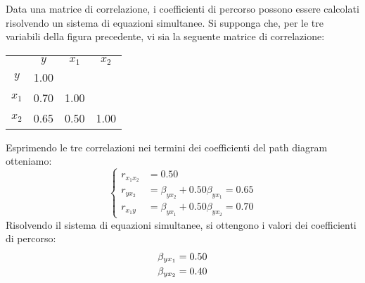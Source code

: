 Data una matrice di correlazione, i coefficienti di percorso possono essere calcolati risolvendo un sistema di equazioni simultanee. 
Si supponga che, per le tre variabili della figura precedente, vi sia la seguente matrice di correlazione:

\begin{center}
    \begin{tabular}{cccc}
          & $y$ & $x_1$ & $x_2$\\
     $y$  & 1.00 &    &   \\
     $x_1$ &  0.70 & 1.00 &    \\
     $x_2$ &  0.65 & 0.50 & 1.00\\
    \end{tabular}
\end{center}
Esprimendo le tre correlazioni nei termini dei coefficienti del path diagram otteniamo:
\[  
\begin{cases} 
r_{x_1x_2} &= 0.50\\ 
r_{yx_2} &= \beta_{yx_2} + 0.50 \beta_{yx_1} = 0.65\\ 
r_{x_1y} &= \beta_{yx_1} +   0.50 \beta_{yx_2} = 0.70
\end{cases} 
\] 
Risolvendo il sistema di equazioni simultanee, si ottengono i
  valori dei coefficienti di percorso: 
\begin{align} 
\beta_{yx_1} &= 0.50\notag\\ 
\beta_{yx_2} &= 0.40\notag
\end{align} 







